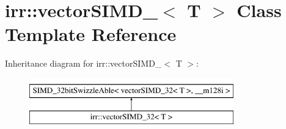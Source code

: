 \hypertarget{classirr_1_1vectorSIMD__32}{}\section{irr\+:\+:vector\+S\+I\+M\+D\+\_$<$ T $>$ Class Template Reference}
\label{classirr_1_1vectorSIMD__32}
Inheritance diagram for irr\+:\+:vector\+S\+I\+M\+D\+\_$<$ T $>$\+:\begin{figure}[H]
\begin{center}
\leavevmode
\includegraphics[height=2.000000cm]{classirr_1_1vectorSIMD__32}
\end{center}
\end{figure}
